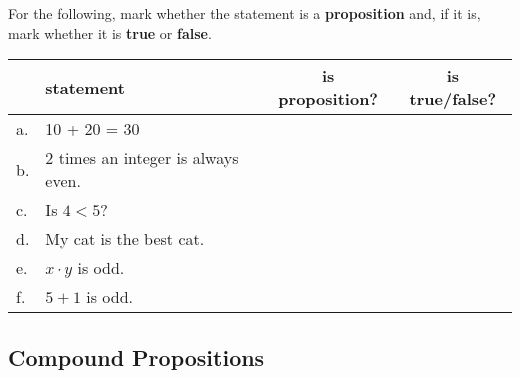     \begin{questionNOGRADE}{\thequestion}
        For the following, mark whether the statement is a \textbf{proposition} and,
        if it is, mark whether it is \textbf{true} or \textbf{false}.

        \begin{center}
            \begin{tabular}{l l | c | c}
                & \textbf{statement} & \textbf{is proposition?} & \textbf{is true/false?}
                \\ \hline
                a. & 10 + 20 = 30
                & & \\
                
                b. & 2 times an integer is always even.
                & & \\

                c. & Is $4 < 5$?
                & & \\

                d. & My cat is the best cat.
                & & \\

                e. & $x \cdot y$ is odd.
                & & \\

                f. & $5 + 1$ is odd.
                & & \\
            \end{tabular}
        \end{center}

    \end{questionNOGRADE}

    \newpage

    \subsection{Compound Propositions}

